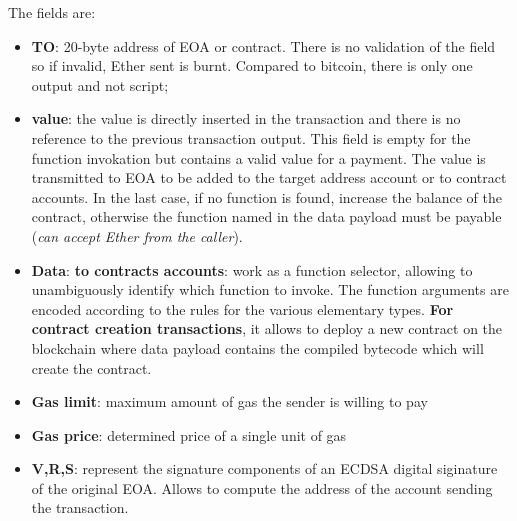 \documentclass[10pt,a4paper]{report}
\begin{document}
The fields are:
\begin{itemize}
	\item 
	\textbf{TO}: 20-byte address of EOA or contract. There is no validation of the field so if invalid, Ether sent is burnt. Compared to bitcoin, there is only one output and not script;
	\item 
	\textbf{value}: the value is directly inserted in the transaction and there is no reference to the previous transaction output. This field is empty for the function invokation but contains a valid value for a payment. The value is transmitted to EOA to be added to the target address account or to contract accounts. In the last case, if no function is found, increase the balance of the contract, otherwise the function named in the data payload must be payable (\textit{can accept Ether from the caller}).
	\item 
	\textbf{Data}: \textbf{to contracts accounts}: work as a function selector, allowing to unambiguously identify which function to invoke. The function arguments are encoded according to the rules for the various elementary types. \textbf{For contract creation transactions}, it allows to deploy a new contract on the blockchain where data payload contains the compiled bytecode which will create the contract.
	\item 
	\textbf{Gas limit}: maximum amount of gas the sender is willing to pay
	\item 
	\textbf{Gas price}: determined price of a single unit of gas
	\item 
	\textbf{V,R,S}: represent the signature components of an ECDSA digital siginature of the original EOA. Allows to compute the address of the account sending the transaction.
\end{itemize}
\end{document}

